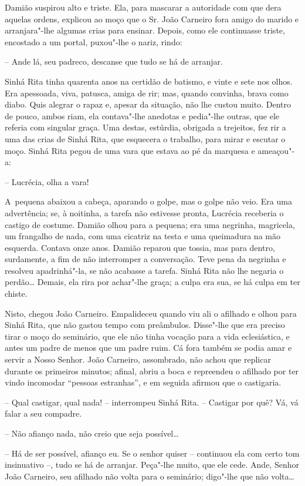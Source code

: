 Damião suspirou alto e triste. Ela, para mascarar a autoridade com que
dera aquelas ordens, explicou ao moço que o Sr. João Carneiro fora amigo
do marido e arranjara"-lhe algumas crias para ensinar. Depois, como ele
continuasse triste, encostado a um portal, puxou"-lhe o nariz, rindo:

-- Ande lá, seu padreco, descanse que tudo se há de arranjar.

Sinhá Rita tinha quarenta anos na certidão de batismo, e vinte e sete
nos olhos. Era apessoada, viva, patusca, amiga de rir; mas, quando
convinha, brava como diabo. Quis alegrar o rapaz e, apesar da situação,
não lhe custou muito. Dentro de pouco, ambos riam, ela contava"-lhe
anedotas e pedia"-lhe outras, que ele referia com singular graça. Uma
destas, estúrdia, obrigada a trejeitos, fez rir a uma das crias de Sinhá
Rita, que esquecera o trabalho, para mirar e escutar o moço. Sinhá Rita
pegou de uma vara que estava ao pé da marquesa e ameaçou"-a:

-- Lucrécia, olha a vara!

A~pequena abaixou a cabeça, aparando o golpe, mas o golpe não veio. Era
uma advertência; se, à noitinha, a tarefa não estivesse pronta, Lucrécia
receberia o castigo de costume. Damião olhou para a pequena; era uma
negrinha, magricela, um frangalho de nada, com uma cicatriz na testa e
uma queimadura na mão esquerda. Contava onze anos. Damião reparou que
tossia, mas para dentro, surdamente, a fim de não interromper a
conversação. Teve pena da negrinha e resolveu apadrinhá"-la, se não
acabasse a tarefa. Sinhá Rita não lhe negaria o perdão\ldots{} Demais, ela
rira por achar"-lhe graça; a culpa era sua, se há culpa em ter chiste.

Nisto, chegou João Carneiro. Empalideceu quando viu ali o afilhado e
olhou para Sinhá Rita, que não gastou tempo com preâmbulos. Disse"-lhe
que era preciso tirar o moço do seminário, que ele não tinha vocação
para a vida eclesiástica, e antes um padre de menos que um padre ruim.
Cá fora também se podia amar e servir a Nosso Senhor. João Carneiro,
assombrado, não achou que replicar durante os primeiros minutos; afinal,
abriu a boca e repreendeu o afilhado por ter vindo incomodar ``pessoas
estranhas'', e em seguida afirmou que o castigaria.

-- Qual castigar, qual nada! -- interrompeu Sinhá Rita. -- Castigar por
quê? Vá, vá falar a seu compadre.

-- Não afianço nada, não creio que seja possível\ldots{}

-- Há de ser possível, afianço eu. Se o senhor quiser -- continuou
ela com certo tom insinuativo --, tudo se há de arranjar. Peça"-lhe
muito, que ele cede. Ande, Senhor João Carneiro, seu afilhado não volta
para o seminário; digo"-lhe que não volta\ldots{}

